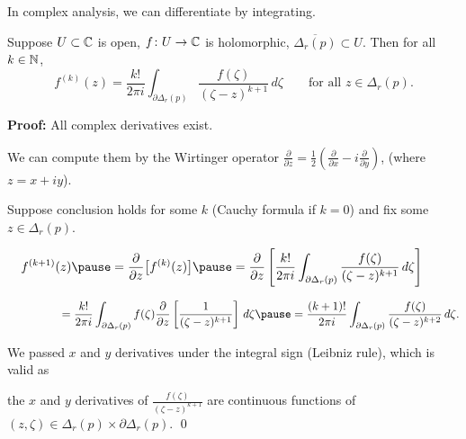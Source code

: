 \documentclass[10pt,aspectratio=169]{beamer}
\begin{document}
\begin{frame}
In complex analysis, we can differentiate by integrating.

\pause

\begin{theorem}
Suppose $U \subset {\mathbb{C}}$ is open, $f \colon U \to {\mathbb{C}}$ is holomorphic,
$\overline{\Delta_r(p)} \subset U$.
Then for all $k \in {\mathbb{N}}$,
\[
f^{(k)}(z)
=
\frac{k!}{2\pi i}
\int_{\partial \Delta_r(p)}
\frac{f(\zeta)}{(\zeta-z)^{k+1}}
\,
d \zeta
\qquad
\text{for all } z \in \Delta_r(p) .
\]
\end{theorem}

\pause

\textbf{Proof:}
All complex derivatives exist.

\pause

We can compute them by
the Wirtinger operator
$\frac{\partial}{\partial z} =
\frac{1}{2}
\left(
\frac{\partial}{\partial x} - i
\frac{\partial}{\partial y}
\right)$,
(where $z=x+iy$).
\pause

Suppose conclusion holds for some $k$ (Cauchy formula if $k=0$) and fix some $z \in \Delta_r(p)$.

\medskip
\pause

$\displaystyle
\quad
f^{(k+1)}(z)
\pause
=
\frac{\partial }{\partial z}
\bigl[ f^{(k)}(z) \bigr]
\pause
=
\frac{\partial }{\partial z}
\left[
\frac{k!}{2\pi i}
\int_{\partial \Delta_r(p)}
\frac{f(\zeta)}{(\zeta-z)^{k+1}}
\,
d \zeta
\right]
$

\medskip
\pause

$\displaystyle
\qquad \qquad \,\,\,\,
= 
\frac{k!}{2\pi i}
\int_{\partial \Delta_r(p)}
f(\zeta)
\frac{\partial }{\partial z}
\left[
\frac{1}{(\zeta-z)^{k+1}}
\right]
\,
d \zeta
\pause
= 
\frac{(k+1)!}{2\pi i}
\int_{\partial \Delta_r(p)}
\frac{f(\zeta)}{(\zeta-z)^{k+2}}
\,
d \zeta .
$

\pause
\medskip

We passed $x$ and $y$ derivatives under the integral sign (Leibniz rule),
\pause
which is valid as

the $x$ and $y$ derivatives of
$\frac{f(\zeta)}{(\zeta-z)^{k+1}}$ are continuous
functions of $(z,\zeta) \in \Delta_r(p) \times \partial \Delta_r(p)$.
\qed
\end{frame}
\end{document}
